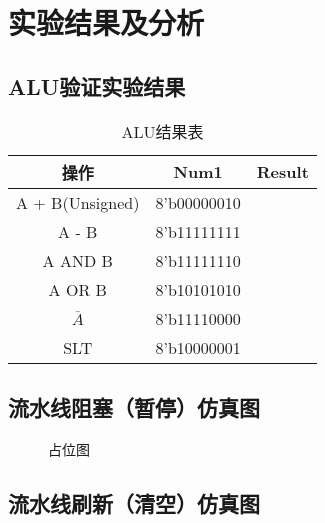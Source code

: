 \section{实验结果及分析}
\subsection{ALU验证实验结果}
\begin{table}[htbp]
    \centering
    \begin{tabular}{c|c|c}
        操作            &	Num1        &	Result\\
        \hline
        A + B(Unsigned) &	8’b00000010 & 	\\
        A - B           &	8’b11111111 &	\\
        A AND B         &	8’b11111110 &	\\
        A OR B          &	8’b10101010 &	\\
        $\overline{A}$  &	8’b11110000 &	\\
        SLT             &	8’b10000001 &	\\
        \hline
    \end{tabular}
    \caption{ALU结果表}
    \label{tab:my_label}
\end{table}
\subsection{流水线阻塞（暂停）仿真图}
\begin{figure}[htbp]
    \centering
    \caption{占位图}
    \label{fig:my_label}
\end{figure}
\subsection{流水线刷新（清空）仿真图}